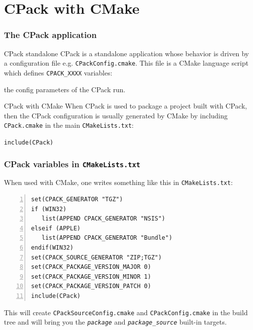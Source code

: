 \documentclass[compress,slidestop,table
              ]
               {beamer}
\newcommand{\fname}[1]{\texttt{#1}}
\begin{document}
\section{CPack with CMake}


\begin{frame}
\frametitle{The CPack application}
\begin{block}{CPack standalone}
CPack is a standalone application whose behavior is
driven by a configuration file e.g. \fname{CPackConfig.cmake}.
This file is a CMake language script which defines
\lstinline!CPACK_XXXX! variables:

the config parameters of the CPack run.
\end{block}
\begin{block}{CPack with CMake}
When CPack is used to package a project built with CPack,
then the CPack configuration is usually generated by CMake by
including \fname{CPack.cmake} in the main \fname{CMakeLists.txt}:

\lstinline!include(CPack)!
\end{block}
\end{frame}

\begin{frame}[fragile]
\frametitle{CPack variables in \fname{CMakeLists.txt}}
When used with CMake, one writes something like this in \fname{CMakeLists.txt}:
\begin{lstlisting}[basicstyle=\scriptsize,numbers=left]
set(CPACK_GENERATOR "TGZ")
if (WIN32)
   list(APPEND CPACK_GENERATOR "NSIS")
elseif (APPLE)
   list(APPEND CPACK_GENERATOR "Bundle")
endif(WIN32)
set(CPACK_SOURCE_GENERATOR "ZIP;TGZ")
set(CPACK_PACKAGE_VERSION_MAJOR 0)
set(CPACK_PACKAGE_VERSION_MINOR 1)
set(CPACK_PACKAGE_VERSION_PATCH 0)
include(CPack)
\end{lstlisting}
This will create \fname{CPackSourceConfig.cmake} and \fname{CPackConfig.cmake}
in the build tree and will bring you the \emph{\fname{package}} and \emph{\fname{package\_source}}
built-in targets.
\end{frame}
\end{document}
